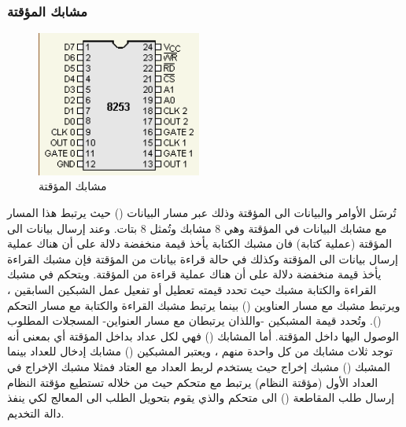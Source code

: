 \documentclass[document.tex]{subfiles}
\begin{document}
\subsubsection{مشابك المؤقتة }
\begin{figure}
  \vspace{-20pt}
  \begin{center}
    \includegraphics[width=0.48\textwidth]{../img/pit_pins}
  \end{center}
  \vspace{-20pt}
  \caption{مشابك المؤقتة }
  \vspace{-10pt}
\label{fig:pit_pins} 
\end{figure}
تُرسَل الأوامر والبيانات الى المؤقتة وذلك عبر مسار البيانات () حيث يرتبط هذا المسار مع مشابك البيانات في المؤقتة وهي 8 مشابك  وتُمثل 8 بتات. وعند إرسال بيانات الى المؤقتة (عملية كتابة) فان مشبك الكتابة  يأخذ قيمة منخفضة دلالة على أن هناك عملية إرسال بيانات الى المؤقتة وكذلك في حالة قراءة بيانات من المؤقتة فإن مشبك القراءة  يأخذ قيمة منخفضة دلالة على أن هناك عملية قراءة من المؤقتة. ويتحكم في مشبك القراءة والكتابة مشبك  حيث تحدد قيمته تعطيل أو تفعيل عمل الشبكين السابقين ، ويرتبط مشبك  مع مسار العناوين () بينما يرتبط مشبك القراءة والكتابة مع مسار التحكم (). وتُحدد قيمة المشبكين  -واللذان يرتبطان مع مسار العنواين- المسجلات المطلوب الوصول اليها داخل المؤقتة. أما المشابك () فهي لكل عداد بداخل المؤقتة أي بمعنى أنه توجد ثلاث مشابك من كل واحدة منهم ، ويعتبر المشبكين () مشابك إدخال للعداد بينما المشبك () مشبك إخراج حيث يستخدم لربط العداد مع العتاد فمثلا مشبك الإخراج في العداد الأول (مؤقتة النظام) يرتبط مع متحكم  حيث من خلاله تستطيع مؤقتة النظام إرسال طلب المقاطعة () الى متحكم  والذي يقوم بتحويل الطلب الى المعالج لكي ينفذ دالة التخديم.
\end{document}
